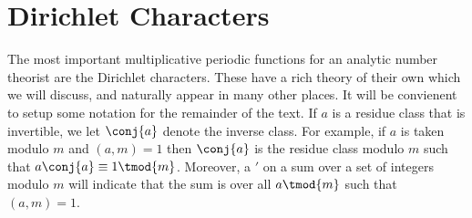     \section{Dirichlet Characters}
      The most important multiplicative periodic functions for an analytic number theorist are the Dirichlet characters. These have a rich theory of their own which we will discuss, and naturally appear in many other places. It will be convienent to setup some notation for the remainder of the text. If $a$ is a residue class that is invertible, we let $\conj{a}$ denote the inverse class. For example, if $a$ is taken modulo $m$ and $(a,m) = 1$ then $\conj{a}$ is the residue class modulo $m$ such that $a\conj{a} \equiv 1 \tmod{m}$. Moreover, a $'$ on a sum over a set of integers modulo $m$ will indicate that the sum is over all $a \tmod{m}$ such that $(a,m) = 1$.

